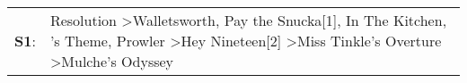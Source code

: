\begin{supertabular}{p{0.03\textwidth}p{0.92\textwidth}}
 \textbf{S1}:  &  Resolution\textsuperscript{} \textgreater \enspace Walletsworth\textsuperscript{}, \enspace Pay the Snucka[1]\textsuperscript{}, \enspace In The Kitchen\textsuperscript{}, 's Theme\textsuperscript{}, \enspace Prowler\textsuperscript{} \textgreater \enspace Hey Nineteen[2]\textsuperscript{} \textgreater \enspace Miss Tinkle's Overture\textsuperscript{} \textgreater \enspace Mulche's Odyssey\textsuperscript{}  \enspace  \\
\end{supertabular}
